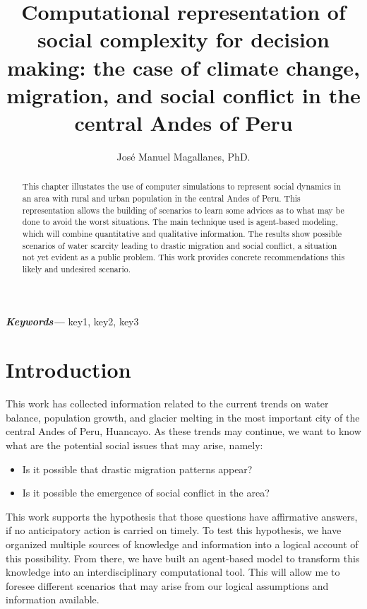 \documentclass{article}
\title{Computational representation of social complexity for decision making: the case of climate change, migration, and social conflict in the central Andes of Peru}
\author{\normalsize Jos\'{e} Manuel Magallanes, PhD.}
\affil{\small Senior Researcher at Instituto de Anal\'{i}tica Social e Inteligencia Estrat\'{e}gica (PULSO PUCP), \\ 
Professor at Departamento de Ciencias Sociales,\\
Pontificia Universidad Cat\'{o}lica del Per\'{u} - PUCP\\ 
\texttt{jmagallanes@pucp.edu.pe}}
\providecommand{\keywords}[1]
{
  \small	
  \textbf{\textit{Keywords---}} #1
}
\begin{document}


\maketitle

\begin{abstract}
This chapter illustates the use of computer simulations to represent social dynamics in an area with rural and urban population in the central Andes of Peru. This representation allows the building of scenarios to learn some advices as to what may be done to avoid the worst situations. The main technique used is agent-based modeling, which will combine quantitative and qualitative information. The results show possible scenarios of water scarcity leading to drastic migration and social conflict, a situation not yet evident as a public problem. This work provides concrete recommendations this likely and undesired scenario. 


\end{abstract}

\keywords{key1, key2, key3}

\section{Introduction}

This work has collected information related to the current trends on water balance, population growth, and glacier melting in the most important city of the central Andes of Peru, Huancayo. As these trends may continue, we want to know what are the potential social issues that may arise, namely:
\begin{itemize}
\item Is it possible that drastic migration patterns appear?
\item Is it possible the emergence of social conflict in the area?
\end{itemize}

This work supports the hypothesis that those questions have affirmative answers, if no anticipatory action is carried on timely. To test this hypothesis, we have organized multiple sources of knowledge and information into  a logical account of this possibility. From there, we have built an agent-based model to transform this knowledge into an interdisciplinary computational tool. This will allow me to foresee different scenarios that may arise from our logical assumptions and information available. 
\end{document}

